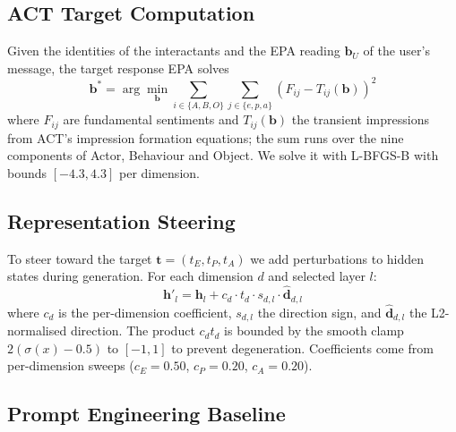 \documentclass[letterpaper]{article} %
\begin{document}
\begin{table}[t]
\centering
\caption{EPA reading quality on the held-out calibration set (130 utterances). $r$: Pearson correlation; MAE: mean absolute error. Llama values are from the reading-quality experiment; Ministral and Mistral-7B values are from their tuning files (Mistral-7B has no Potency reader).}
\label{tab:reading}

\end{table}

\subsection{ACT Target Computation}

Given the identities of the interactants and the EPA reading $\mathbf{b}_U$ of the user's message, the target response EPA solves
\begin{equation}
\mathbf{b}^* = \arg\min_{\mathbf{b}} \sum_{i \in \{A,B,O\}} \sum_{j \in \{e,p,a\}} (F_{ij} - T_{ij}(\mathbf{b}))^2
\label{eq:deflection}
\end{equation}
\noindent where $F_{ij}$ are fundamental sentiments and $T_{ij}(\mathbf{b})$ the transient impressions from ACT's impression formation equations; the sum runs over the nine components of Actor, Behaviour and Object. We solve it with L-BFGS-B \citep{byrd1995limited} with bounds $[-4.3, 4.3]$ per dimension.

\subsection{Representation Steering}

To steer toward the target $\mathbf{t} = (t_E, t_P, t_A)$ we add perturbations to hidden states during generation. For each dimension $d$ and selected layer $l$:
\begin{equation}
\mathbf{h}'_l = \mathbf{h}_l + c_d \cdot t_d \cdot s_{d,l} \cdot \hat{\mathbf{d}}_{d,l}
\label{eq:steering}
\end{equation}
\noindent where $c_d$ is the per-dimension coefficient, $s_{d,l}$ the direction sign, and $\hat{\mathbf{d}}_{d,l}$ the L2-normalised direction. The product $c_d t_d$ is bounded by the smooth clamp $2(\sigma(x)-0.5)$ to $[-1,1]$ to prevent degeneration. Coefficients come from per-dimension sweeps ($c_E = 0.50$, $c_P = 0.20$, $c_A = 0.20$).

\subsection{Prompt Engineering Baseline}
\end{document}
